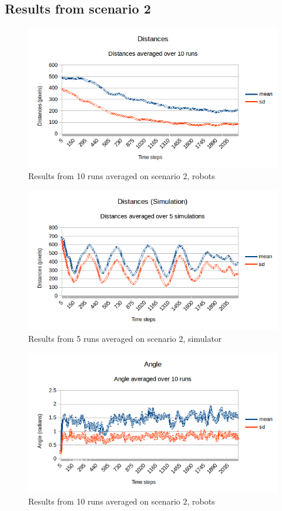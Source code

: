 \subsection{Results from scenario 2}
\label{sec:res2}
\begin{figure}[h]
\begin{center}
\includegraphics[width=0.8\linewidth]{figs/runs/2pdist}
\end{center}
\caption[2. Distances, robots]{Results from 10 runs averaged on scenario 2, robots}
\label{fig:res2pdist}
\end{figure}
\begin{figure}[h]
\begin{center}
\includegraphics[width=0.8\linewidth]{figs/runs/2sdist}
\end{center}
\caption[2. Distances, simulation]{Results from 5 runs averaged on scenario 2, simulator}
\label{fig:res2sdist}
\end{figure}
\begin{figure}[h]
\begin{center}
\includegraphics[width=0.8\linewidth]{figs/runs/2pangle}
\end{center}
\caption[2. Angle, robots]{Results from 10 runs averaged on scenario 2, robots}
\label{fig:res2pang}
\end{figure}
